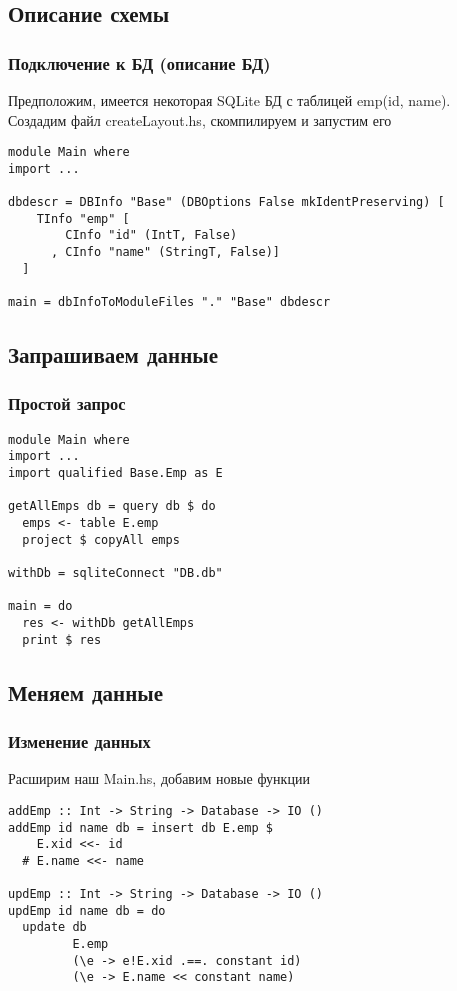 \documentclass[12pt]{beamer}
\begin{document}
\subsection{Описание схемы}
\begin{frame}[fragile]
\frametitle{Подключение к БД (описание БД)}
Предположим, имеется некоторая SQLite БД с таблицей emp(id, name). Создадим файл createLayout.hs, скомпилируем и запустим его
\begin{lstlisting}
module Main where
import ...

dbdescr = DBInfo "Base" (DBOptions False mkIdentPreserving) [
    TInfo "emp" [
        CInfo "id" (IntT, False)
      , CInfo "name" (StringT, False)]
  ]

main = dbInfoToModuleFiles "." "Base" dbdescr
\end{lstlisting}
\end{frame}

\subsection{Запрашиваем данные}
\begin{frame}[fragile]
\frametitle{Простой запрос}
\begin{lstlisting}
module Main where
import ...
import qualified Base.Emp as E

getAllEmps db = query db $ do
  emps <- table E.emp
  project $ copyAll emps
  
withDb = sqliteConnect "DB.db"

main = do
  res <- withDb getAllEmps
  print $ res
\end{lstlisting}
\end{frame}

\subsection{Меняем данные}
\begin{frame}[fragile]
\frametitle{Изменение данных}
Расширим наш Main.hs, добавим новые функции
\begin{lstlisting}
addEmp :: Int -> String -> Database -> IO ()
addEmp id name db = insert db E.emp $
    E.xid <<- id
  # E.name <<- name

updEmp :: Int -> String -> Database -> IO ()
updEmp id name db = do
  update db
         E.emp
         (\e -> e!E.xid .==. constant id)
         (\e -> E.name << constant name)
\end{lstlisting}
\end{frame}
\end{document}
